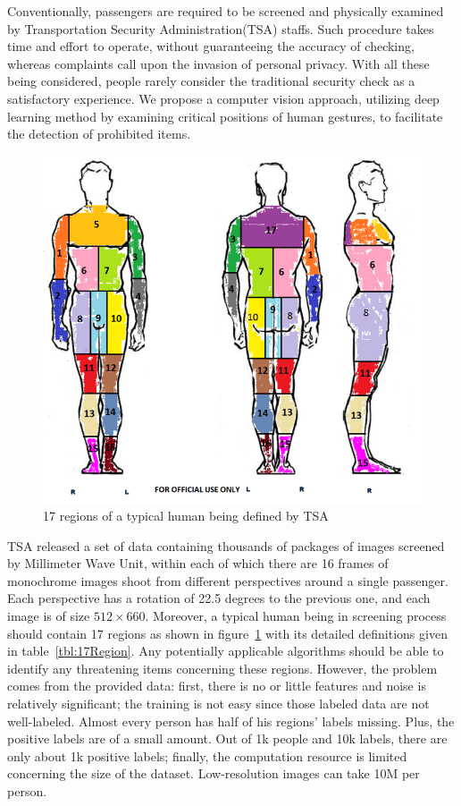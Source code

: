 \documentclass[conference,compsoc]{IEEEtran}
\begin{document}
Conventionally, passengers are required to be screened and physically examined by Transportation Security Administration(TSA) staffs. Such procedure takes time and effort to operate, without guaranteeing the accuracy of checking,  whereas complaints call upon the invasion of personal privacy. With all these being considered, people rarely consider the traditional security check as a satisfactory experience. We propose a computer vision approach, utilizing deep learning method by examining critical positions of human gestures, to facilitate the detection of prohibited items.
\begin{figure}[!tp]
\includegraphics[width=.5\textwidth]{../Pic/body_zones}
\caption{17 regions of a typical human being defined by TSA}
\label{fig:17Region}
\end{figure}

TSA released a set of data containing thousands of packages of images screened by Millimeter Wave Unit, within each of which there are 16 frames of monochrome images shoot from different perspectives around a single passenger. Each perspective has a rotation of 22.5 degrees to the previous one, and each image is of size $512\times660$. Moreover, a typical human being in screening process should contain 17 regions as shown in figure~\ref{fig:17Region} with its detailed definitions given in table~\ref{tbl:17Region}. Any potentially applicable algorithms should be able to identify any threatening items concerning these regions. However, the problem comes from the provided data: first, there is no or little features and noise is relatively significant; the training is not easy since those labeled data are not well-labeled. Almost every person has half of his regions' labels missing. Plus, the positive labels are of a small amount. Out of 1k people and 10k labels, there are only about 1k positive labels; finally, the computation resource is limited concerning the size of the dataset. Low-resolution images can take 10M per person.
\end{document}
